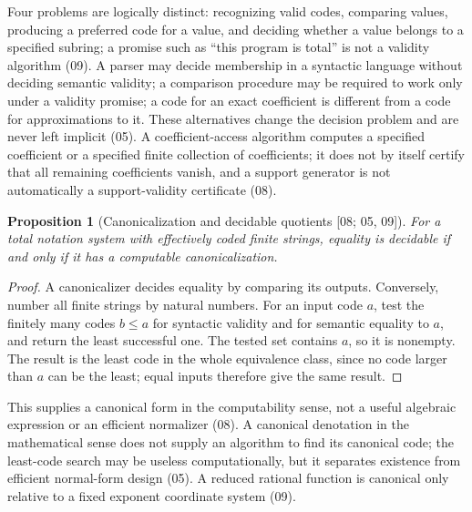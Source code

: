 \documentclass[11pt,oneside]{article}
\numberwithin{equation}{section}
\newtheorem{proposition}[proposition]{Proposition}
\theoremstyle{definition}
\theoremstyle{remark}
\newcommand{\src}[1]{\textup{\textsf{\small[#1]}}}
\begin{document}
Four problems are logically distinct: recognizing valid codes, comparing
values, producing a preferred code for a value, and deciding whether a value
belongs to a specified subring; a promise such as ``this program is total'' is
not a validity algorithm (09). A parser may decide membership in a syntactic
language without deciding semantic validity; a comparison procedure may be
required to work only under a validity promise; a code for an exact coefficient
is different from a code for approximations to it. These alternatives change the
decision problem and are never left implicit (05). A coefficient-access
algorithm computes a specified coefficient or a specified finite collection of
coefficients; it does not by itself certify that all remaining coefficients
vanish, and a support generator is not automatically a support-validity
certificate (08).

\begin{proposition}[Canonicalization and decidable quotients \src{08; 05, 09}]\label{onot:prop:canonical}
For a total notation system with effectively coded finite strings, equality is
decidable if and only if it has a computable canonicalization.
\end{proposition}
\begin{proof}
A canonicalizer decides equality by comparing its outputs. Conversely, number
all finite strings by natural numbers. For an input code $a$, test the finitely
many codes $b\le a$ for syntactic validity and for semantic equality to $a$, and
return the least successful one. The tested set contains $a$, so it is nonempty.
The result is the least code in the whole equivalence class, since no code larger
than $a$ can be the least; equal inputs therefore give the same result.
\end{proof}
This supplies a canonical form in the computability sense, not a useful
algebraic expression or an efficient normalizer (08). A canonical denotation in
the mathematical sense does not supply an algorithm to find its canonical code;
the least-code search may be useless computationally, but it separates existence
from efficient normal-form design (05). A reduced rational function is canonical
only relative to a fixed exponent coordinate system (09).
\end{document}
